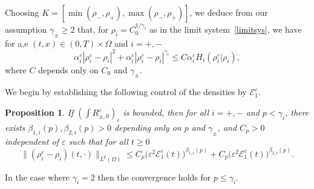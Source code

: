 \documentclass[11pt, twoside, a4paper]{article}
\theoremstyle{plain}
\newtheorem{proposition}[theorem]{Proposition}
\theoremstyle{remark}
\numberwithin{equation}{section}
\def\EE{{\mathcal E}}
\renewcommand{\leq}{\leqslant}\renewcommand{\le}{\leqslant}
\renewcommand{\geq}{\geqslant}\renewcommand{\ge}{\geqslant}
\newcommand{\eps}{\varepsilon}
\begin{document}
Choosing $K=[\min(\rho_-,\rho_+),\max(\rho_-,\rho_+)]$, we deduce from our assumption $\gamma_\pm\geq 2$ that, for $\rho_i=C_0^{1/\gamma_i}$ as in the limit system~\eqref{limitsys}, we have for a.e $(t,x)\in (0,T)\times \Omega$ and $i=+,-$
\begin{equation}\label{eqB}
 \alpha_i^\eps |\rho_i^\eps - \rho_i |^2+\alpha_i^\eps |\rho_i^\eps - \rho_i |^{\gamma_i}\leq C \alpha_i^\eps H_i( \rho_i^\eps \vert \rho_i ),
\end{equation}
where $C$ depends only on $C_0$ and $\gamma_\pm$.



We begin by establishing the following control of the densities by $\EE_1^\eps$.

\begin{proposition}\label{prop.rhoE1}
 If $(\int R_{\pm,0}^\eps)_\eps$ is bounded, then for all $i=+,-$ and $p<\gamma_i$, there exists $\beta_{1,i}(p), \beta_{2,i}(p)>0$ depending only on $p$ and $\gamma_\pm$, and $C_p>0$ independent of $\eps$ such that for all $t\geq 0$
 \[
 \| (\rho_i^\eps - \rho_i)(t,\cdot) \|_{L^p(\Omega)} \leq C_p \Big(\eps^{2} \EE_1^\eps(t) \Big)^{\beta_{1,i}(p)}+C_p\Big(\eps^{2} \EE_1^\eps(t) \Big)^{\beta_{2,i}(p)}.
 \]
\end{proposition}
In the case where $\gamma_i=2$ then the convergence holds for $p\leq \gamma_i$.
\end{document}
